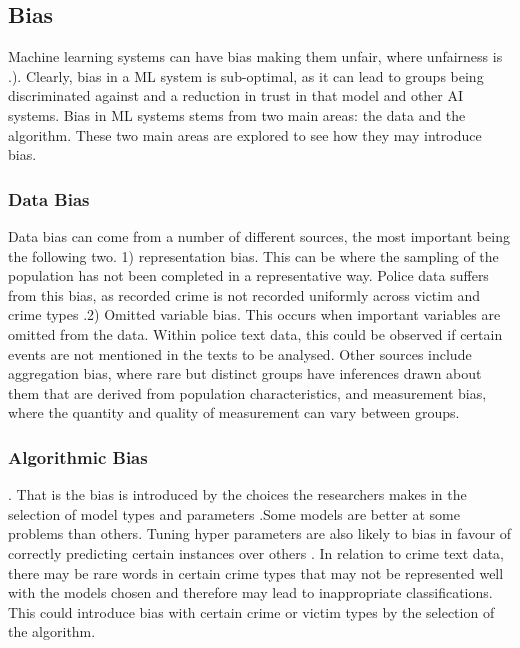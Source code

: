\subsection{Bias} Machine learning systems can have bias making them unfair, where unfairness is  \parencite{mehrabi2021survey}.). Clearly, bias in a ML system is sub-optimal, as it can lead to groups being discriminated against and a reduction in trust in that model and other AI systems. Bias in ML systems stems from two main areas: the data and the algorithm. These two main areas are explored to see how they may introduce bias.

\subsubsection{Data Bias} Data bias can come from a number of different sources, the most important being the following two. 1) representation bias. This can be where the sampling of the population has not been completed in a representative way. Police data suffers from this bias, as recorded crime is not recorded uniformly across victim and crime types  \parencite{baumer2002neighborhood, tarling2010reporting }.2) Omitted variable bias. This occurs when important variables are omitted from the data. Within police text data, this could be observed if certain events are not mentioned in the texts to be analysed. Other sources include aggregation bias, where rare but distinct groups have inferences drawn about them that are derived from population characteristics, and measurement bias, where the quantity and quality of measurement can vary between groups.

\subsubsection{Algorithmic Bias}  \parencite{mehrabi2021survey}. That is the bias is introduced by the choices the researchers makes in the selection of model types and parameters \parencite{hooker2021moving}.Some models are better at some problems than others. Tuning hyper parameters are also likely to bias in favour of correctly predicting certain instances over others \parencite{paiva2022relating}. In relation to crime text data, there may be rare words in certain crime types that may not be represented well with the models chosen and therefore may lead to inappropriate classifications. This could introduce bias with certain crime or victim types by the selection of the algorithm.

